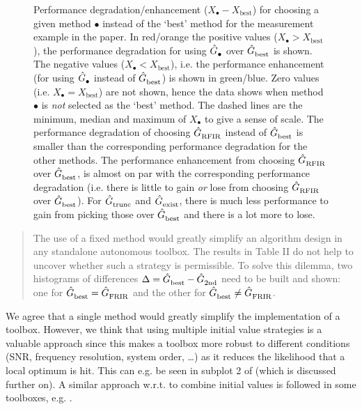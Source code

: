 \begin{figure}
  \centering
  \setlength{\figurewidth}{0.75\columnwidth}
  \setlength{\figureheight}{0.60\figurewidth}
  
  \caption{
  Performance degradation/enhancement ($X_{\bullet}-X_{\mathrm{best}}$) for choosing a given method $\bullet$ instead of the `best' method for the measurement example in the paper.
  In red/orange the positive values ($X_{\bullet} > X_{\mathrm{best}}$), the performance degradation for using $\hat{G}_{\mathrm{\bullet}}^{\mathrm{}}$ over $\hat{G}_{\mathrm{best}}^{\mathrm{}}$ is shown.
  The negative values ($X_{\bullet} < X_{\mathrm{best}}$), i.e. the performance enhancement (for using $\hat{G}_{\mathrm{\bullet}}^{\mathrm{}}$ instead of $\hat{G}_{\mathrm{best}}^{\mathrm{}}$) is shown in green/blue.
  Zero values (i.e. $X_{\bullet} = X_{\mathrm{best}}$) are not shown, hence the data shows when method $\bullet$ is \emph{not} selected as the `best' method.
  The dashed lines are the minimum, median and maximum of $X_{\bullet}$ to give a sense of scale.
  The performance degradation of choosing $\hat{G}_{\mathrm{RFIR}}^{\mathrm{}}$ instead of $\hat{G}_{\mathrm{best}}^{\mathrm{}}$ is smaller than the corresponding performance degradation for the other methods.
  The performance enhancement from choosing $\hat{G}_{\mathrm{RFIR}}^{\mathrm{}}$ over $\hat{G}_{\mathrm{best}}^{\mathrm{}}$, is almost on par with the corresponding performance degradation (i.e. there is little to gain \emph{or} lose from choosing $\hat{G}_{\mathrm{RFIR}}^{\mathrm{}}$ over $\hat{G}_{\mathrm{best}}^{\mathrm{}}$).
  For $\hat{G}_{\mathrm{trunc}}^{\mathrm{}}$ and $\hat{G}_{\mathrm{exist}}^{\mathrm{}}$, there is much less performance to gain from picking those over $\hat{G}_{\mathrm{best}}^{\mathrm{}}$ and there is a lot more to lose.
  }
  \label{fig:histogram}
\end{figure}

\begin{quote}

The use of a fixed method would greatly simplify an algorithm design in any standalone autonomous toolbox. The results in Table II do not help to uncover whether such a strategy is permissible. To solve this dilemma, two histograms of differences $\Delta = \hat{G}_{\mathrm{best}}^{\mathrm{}} - \hat{G}_{\mathrm{2nd}}^{\mathrm{}}$ need to be built and shown: one for $\hat{G}_{\mathrm{best}}^{\mathrm{}} = \hat{G}_{\mathrm{FRIR}}^{\mathrm{}}$ and the other for $\hat{G}_{\mathrm{best}}^{\mathrm{}} \neq \hat{G}_{\mathrm{FRIR}}^{\mathrm{}}$. 
\end{quote}

We agree that a single method would greatly simplify the implementation of a toolbox.
However, we think that using multiple initial value strategies is a valuable approach since this makes a toolbox more robust to different conditions (SNR, frequency resolution, system order, \ldots) as it reduces the likelihood that a local optimum is hit.
This can e.g. be seen in subplot 2 of  (which is discussed further on).
A similar approach w.r.t. to combine initial values is followed in some toolboxes, e.g. \cite{FDIDENT,TDIDENT}.

